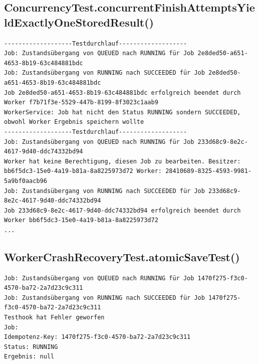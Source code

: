 \subsection*{ConcurrencyTest.concurrentFinishAttemptsYieldExactlyOneStoredResult()}
\label{subsec:testlog_z3_b}
\begin{lstlisting}[language={}, style=logs, numbers=none]
-------------------Testdurchlauf-------------------
Job: Zustandsübergang von QUEUED nach RUNNING für Job 2e8ded50-a651-4653-8b19-63c484881bdc
Job: Zustandsübergang von RUNNING nach SUCCEEDED für Job 2e8ded50-a651-4653-8b19-63c484881bdc
Job 2e8ded50-a651-4653-8b19-63c484881bdc erfolgreich beendet durch Worker f7b71f3e-5529-447b-8199-8f3023c1aab9
WorkerService: Job hat nicht den Status RUNNING sondern SUCCEEDED, obwohl Worker Ergebnis speichern wollte
-------------------Testdurchlauf-------------------
Job: Zustandsübergang von QUEUED nach RUNNING für Job 233d68c9-8e2c-4617-9d40-ddc74332bd94
Worker hat keine Berechtigung, diesen Job zu bearbeiten. Besitzer: bb6f5dc3-15e0-4a19-b81a-8a8225973d72 Worker: 28410689-8325-4593-9981-5a9bf0aacb96
Job: Zustandsübergang von RUNNING nach SUCCEEDED für Job 233d68c9-8e2c-4617-9d40-ddc74332bd94
Job 233d68c9-8e2c-4617-9d40-ddc74332bd94 erfolgreich beendet durch Worker bb6f5dc3-15e0-4a19-b81a-8a8225973d72
...
\end{lstlisting}

\subsection*{WorkerCrashRecoveryTest.atomicSaveTest()}
\label{subsec:testlog_z4}
\begin{lstlisting}[language={}, style=logs, numbers=none]
Job: Zustandsübergang von QUEUED nach RUNNING für Job 1470f275-f3c0-4570-ba72-2a7d23c9c311
Job: Zustandsübergang von RUNNING nach SUCCEEDED für Job 1470f275-f3c0-4570-ba72-2a7d23c9c311
Testhook hat Fehler geworfen
Job:
Idempotenz-Key: 1470f275-f3c0-4570-ba72-2a7d23c9c311
Status: RUNNING
Ergebnis: null
\end{lstlisting}

